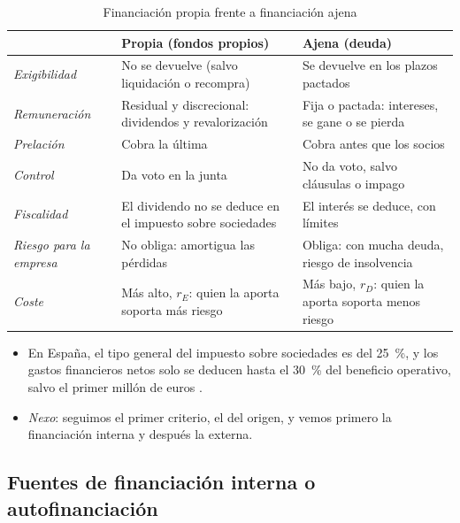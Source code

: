 \documentclass[11pt]{article}
\begin{document}
\begin{table}[H]
\centering
\caption{Financiación propia frente a financiación ajena}\label{tab:propia-ajena}
\begin{tabular}{>{\raggedright\arraybackslash}m{2.8cm}>{\raggedright\arraybackslash}m{5.4cm}>{\raggedright\arraybackslash}m{5.4cm}}
\toprule
\rowcolor{tceeazulpalido} & \textbf{Propia (fondos propios)} & \textbf{Ajena (deuda)} \\
\midrule
\emph{Exigibilidad} & No se devuelve (salvo liquidación o recompra) & Se devuelve en los plazos pactados \\
\emph{Remuneración} & Residual y discrecional: dividendos y revalorización & Fija o pactada: intereses, se gane o se pierda \\
\emph{Prelación} & Cobra la última & Cobra antes que los socios \\
\emph{Control} & Da voto en la junta & No da voto, salvo cláusulas o impago \\
\emph{Fiscalidad} & El dividendo no se deduce en el impuesto sobre sociedades & El interés se deduce, con límites \\
\emph{Riesgo para la empresa} & No obliga: amortigua las pérdidas & Obliga: con mucha deuda, riesgo de insolvencia \\
\rowcolor{tceesalvia}\emph{Coste} & Más alto, $r_E$: quien la aporta soporta más riesgo & Más bajo, $r_D$: quien la aporta soporta menos riesgo \\
\bottomrule
\end{tabular}
\end{table}

\begin{itemize}
\item En España, el tipo general del impuesto sobre sociedades es del 25~\%, y los gastos financieros netos solo se deducen hasta el 30~\% del beneficio operativo, salvo el primer millón de euros\nocite{LIS2014} .
\item \emph{Nexo}: seguimos el primer criterio, el del origen, y vemos primero la financiación interna y después la externa.
\end{itemize}

\subsection{Fuentes de financiación interna o autofinanciación}\label{sec:autofinanciacion}
\end{document}
